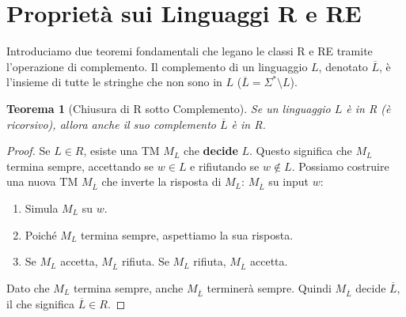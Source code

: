 \documentclass[a4paper]{article}
\newtheorem{theorem}{Teorema}
\theoremstyle{remark} %
\begin{document}
\section{Proprietà sui Linguaggi R e RE}

Introduciamo due teoremi fondamentali che legano le classi R e RE tramite l'operazione di complemento. Il complemento di un linguaggio $L$, denotato $\overline{L}$, è l'insieme di tutte le stringhe che non sono in $L$ ($\overline{L} = \Sigma^* \setminus L$).

\begin{theorem}[Chiusura di R sotto Complemento]
Se un linguaggio $L$ è in R (è ricorsivo), allora anche il suo complemento $\overline{L}$ è in R.
\end{theorem}
\begin{proof}
Se $L \in R$, esiste una TM $M_L$ che \textbf{decide} $L$. Questo significa che $M_L$ termina sempre, accettando se $w \in L$ e rifiutando se $w \notin L$.
Possiamo costruire una nuova TM $M_{\overline{L}}$ che inverte la risposta di $M_L$:
$M_{\overline{L}}$ su input $w$:
\begin{enumerate}
    \item Simula $M_L$ su $w$.
    \item Poiché $M_L$ termina sempre, aspettiamo la sua risposta.
    \item Se $M_L$ accetta, $M_{\overline{L}}$ rifiuta. Se $M_L$ rifiuta, $M_{\overline{L}}$ accetta.
\end{enumerate}
Dato che $M_L$ termina sempre, anche $M_{\overline{L}}$ terminerà sempre. Quindi $M_{\overline{L}}$ decide $\overline{L}$, il che significa $\overline{L} \in R$.
\end{proof}
\end{document}
